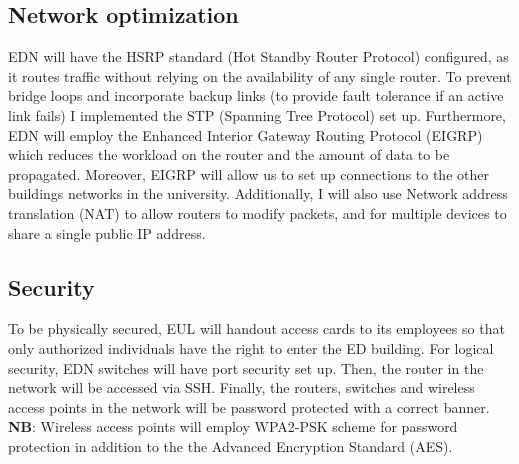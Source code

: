\documentclass[ a4, 12pt, onecolumn]{IEEEtran}
\begin{document}
\subsection{Network optimization}
EDN will have the HSRP standard (Hot Standby Router Protocol) configured, as it routes traffic without relying on the availability of any single router.
To prevent bridge loops and incorporate backup links (to provide fault tolerance if an active link fails) I implemented the STP (Spanning Tree Protocol) set up. Furthermore, EDN will employ the Enhanced Interior Gateway Routing Protocol (EIGRP) which reduces the workload on the router and the amount of data to be propagated. Moreover, EIGRP will allow us to set up connections to the other buildings networks in the university. Additionally, I will also use Network address translation (NAT) to allow routers to modify packets, and for multiple devices to share a single public IP address.

\subsection{Security}
To be physically secured, EUL will handout access cards to its employees so that only authorized individuals have the right to enter the ED building.
For logical security, EDN switches will have port security set up. Then, the router in the network will be accessed via SSH. Finally, the routers, switches and wireless access points in the network will be password protected with a correct banner. \\
\textbf{NB}: Wireless access points will employ WPA2-PSK scheme for password protection in addition to the the Advanced Encryption Standard (AES). 
\end{document}
